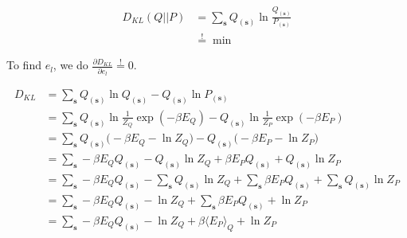 \begin{align*}
	D_{KL}(Q||P) &= \sum_{\boldsymbol{s}} Q_{(\boldsymbol{s})} \ln \frac{Q_{(\boldsymbol{s})}}{P_{(\boldsymbol{s})}} \\
	&\stackrel{!}{=} \min 
\end{align*}


To find $e_l$, we do $\frac{\partial D_{KL} }{\partial e_l } \stackrel{!}{=} 0 $.

\begin{align*}
 D_{KL} &= \sum_{\boldsymbol{s}} Q_{(\boldsymbol{s})} \ln Q_{(\boldsymbol{s})} - Q_{(\boldsymbol{s})} \ln P_{(\boldsymbol{s})} \\
	&= \sum_{\boldsymbol{s}} Q_{(\boldsymbol{s})} \ln \frac{1}{Z_Q} \exp{(-\beta E_Q ) } - Q_{(\boldsymbol{s})} \ln \frac{1}{Z_P} \exp{(-\beta E_P ) } \\
	&= \sum_{\boldsymbol{s}} Q_{(\boldsymbol{s})} \bigg( -\beta E_Q - \ln Z_Q \bigg)  - Q_{(\boldsymbol{s})} \bigg( -\beta E_P - \ln Z_P \bigg ) \\
	&= \sum_{\boldsymbol{s}} -\beta  E_Q Q_{(\boldsymbol{s})}  - Q_{(\boldsymbol{s})} \ln Z_Q  + \beta E_P Q_{(\boldsymbol{s})}  + Q_{(\boldsymbol{s})} \ln Z_P \\
	&=\sum_{\boldsymbol{s}} -\beta  E_Q Q_{(\boldsymbol{s})}  - \sum_{\boldsymbol{s}} Q_{(\boldsymbol{s})} \ln Z_Q  +\sum_{\boldsymbol{s}}  \beta E_P Q_{(\boldsymbol{s})}  + \sum_{\boldsymbol{s}} Q_{(\boldsymbol{s})} \ln Z_P \\
		&=\sum_{\boldsymbol{s}} -\beta  E_Q Q_{(\boldsymbol{s})}  - \ln Z_Q  +\sum_{\boldsymbol{s}}  \beta E_P Q_{(\boldsymbol{s})}  + \ln Z_P \\
				&=\sum_{\boldsymbol{s}} -\beta  E_Q Q_{(\boldsymbol{s})}  - \ln Z_Q  + \beta 
				\langle E_P \rangle_Q + \ln Z_P \\
\end{align*}

